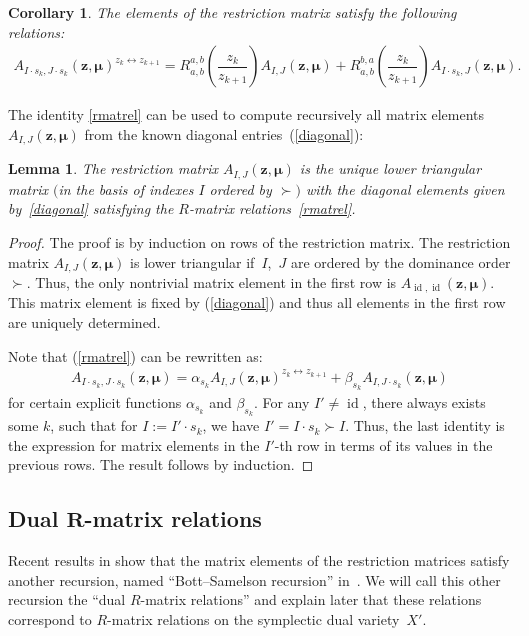 \documentclass[pdftex]{sigma}
\DeclareMathOperator\id{id}
\def\zz{{\boldsymbol z}}
\def\mub{{\boldsymbol\mu}}
\numberwithin{equation}{section}
\newtheorem{Corollary}[Theorem]{Corollary}
\newtheorem{Lemma}[Theorem]{Lemma}
\begin{document}
\begin{Corollary} \label{cor1}The elements of the restriction matrix satisfy the following relations:
\begin{gather} \label{rmatrel}
A_{I\cdot s_{k} ,J \cdot s_{k}}(\zz,\mub)^{z_{k}\leftrightarrow z_{k+1}}=R^{a,b}_{a,b} \left( \dfrac{z_k}{z_{k+1}} \right) A_{I,J}(\zz,\mub) + R^{b,a}_{a,b} \left( \dfrac{z_k}{z_{k+1}} \right) A_{I \cdot s_k, J}(\zz,\mub).
\end{gather}
\end{Corollary}The identity \eqref{rmatrel} can be used to compute recursively all matrix elements $A_{I,J}(\zz,\mub)$ from the known diagonal entries~(\ref{diagonal}):
\begin{Lemma} \label{reclem}
The restriction matrix $A_{I,J}(\zz,\mub)$ is the unique lower triangular matrix $($in the basis of indexes $I$ ordered by $\succ)$ with the diagonal elements given by~\eqref{diagonal} satisfying the $R$-matrix relations~\eqref{rmatrel}.
\end{Lemma}
\begin{proof}The proof is by induction on rows of the restriction matrix. The restriction matrix $A_{I,J}(\zz,\mub)$ is lower triangular if~$I$,~$J$ are ordered
by the dominance order $\succ$. Thus, the only nontrivial matrix element in the first row is $A_{\id,\id}(\zz,\mub)$. This matrix element is fixed by (\ref{diagonal}) and thus all elements in the first row are uniquely determined.

Note that (\ref{rmatrel}) can be rewritten as:
\begin{gather*}
A_{I\cdot s_k,J \cdot s_k}(\zz,\mub)= \alpha_{s_k} A_{I,J}(\zz,\mub)^{z_{k}\leftrightarrow z_{k+1}}+\beta_{s_k} A_{I,J \cdot s_k}(\zz,\mub)
\end{gather*}
for certain explicit functions $\alpha_{s_k}$ and $\beta_{s_k}$. For any $I' \neq \id$, there always exists some $k$, such that for $I := I' \cdot s_k$, we have $I' = I\cdot s_k \succ I$. Thus, the last identity is the expression for matrix elements in the $I'$-th row in terms of its values in the previous rows. The result follows by induction.
\end{proof}

\subsection[Dual $R$-matrix relations]{Dual $\boldsymbol{R}$-matrix relations}
Recent results in \cite{RW} show that the matrix elements of the restriction matrices satisfy another recursion, named ``Bott--Samelson recursion'' in~\cite{RW}. We will call this other recursion the ``dual $R$-matrix relations'' and explain later that these relations correspond to $R$-matrix relations on the symplectic dual variety~$X'$.
\end{document}
